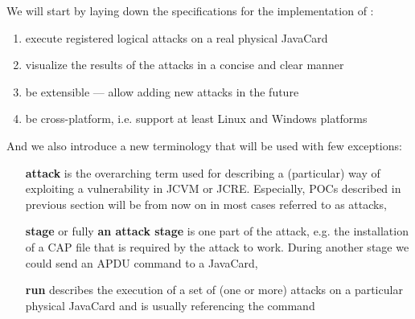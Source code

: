 \documentclass{../llncs/llncs}
\begin{document}
    We will start by laying down the specifications for the implementation of \projectname:
    \begin{enumerate}
        \item execute registered logical attacks on a real physical JavaCard %
        \item visualize the results of the attacks in a concise and clear manner %
        \item be extensible --- allow adding new attacks in the future %
        \item be cross-platform, i.e. support at least Linux and Windows platforms %
    \end{enumerate}


    And we also introduce a new terminology that will be used with few exceptions:

                \begin{enumerate}
                    \item[\textbf{attack}] is the overarching term used for describing a (particular) way of exploiting a vulnerability in JCVM or JCRE\@. Especially, POCs described in previous section will be from now on in most cases referred to as attacks,
                    \item[\textbf{stage}] or fully \textbf{an attack stage} is one part of the attack, e.g. the installation of a CAP file that is required by the attack to work. During another stage we could send an APDU command to a JavaCard,
                    \item[\textbf{run}] describes the execution of a set  of (one or more) attacks on a particular physical JavaCard and is usually referencing the \javusrun command
                \end{enumerate}
\end{document}
